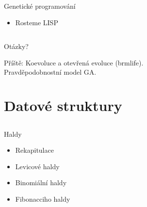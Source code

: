 \documentclass{beamer}
\begin{document}
\subsection{}
\begin{frame}{Genetické programování}
\begin{itemize}
\item Rosteme LISP
\end{itemize}
\end{frame}

\subsection{}
\begin{frame}{Otázky?}
\begin{center}
Příště: Koevoluce a otevřená evoluce (brmlife). \\ Pravděpodobnostní model GA.
\end{center}
\end{frame}

\section{Datové struktury}

\subsection{}
\begin{frame}{Haldy}
\begin{itemize}
\item Rekapitulace
\item Levicové haldy
\item Binomiální haldy
\item Fibonacciho haldy
\end{itemize}
\end{frame}
\end{document}

